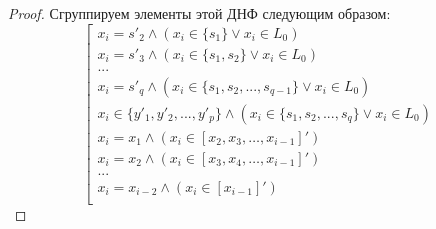 \begin{proof}
  Сгруппируем элементы этой ДНФ следующим образом:
  $$\left[\begin{array}{l}
    x_i = s'_2 \wedge (x_i \in \{s_1\} \vee x_i \in L_0)\\
    x_i = s'_3 \wedge (x_i \in \{s_1, s_2\} \vee x_i \in L_0) \\
    ...\\
    x_i = s'_q \wedge (x_i \in \{s_1, s_2, ..., s_{q-1}\} \vee x_i \in L_0)\\
    x_i \in \{y'_1, y'_2, ..., y'_p\} \wedge (x_i \in \{s_1, s_2, ...,
    s_q\} \vee x_i \in L_0)\\
    x_i = x_1 \wedge (x_i \in [x_2, x_3, \dots, x_{i-1}]')\\
    x_i = x_2 \wedge (x_i \in [x_3, x_4, \dots, x_{i-1}]')\\
    ...\\
    x_i = x_{i-2} \wedge (x_i \in [x_{i-1}]')\\
  \end{array}\right.$$


\end{proof}
